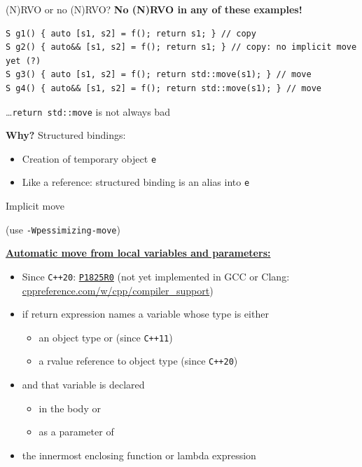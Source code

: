 \documentclass[compress,aspectratio=1610]{beamer}
\begin{document}
\begin{frame}[fragile]{(N)RVO or no (N)RVO?}
    \textbf{No (N)RVO in any of these examples!}
    \begin{lstlisting}
S g1() { auto [s1, s2] = f(); return s1; } // copy
S g2() { auto&& [s1, s2] = f(); return s1; } // copy: no implicit move yet (?)
S g3() { auto [s1, s2] = f(); return std::move(s1); } // move
S g4() { auto&& [s1, s2] = f(); return std::move(s1); } // move
    \end{lstlisting}
    
    \hfill \ldots \texttt{return std::move} is not always bad

    \textbf{Why?} Structured bindings:
    \begin{itemize}
        \item Creation of temporary object \texttt{e}
        \item Like a reference: structured binding is an alias into \texttt{e}
    \end{itemize}
\end{frame}

\begin{frame}{Implicit move}
    \begin{center}

        (use \texttt{-Wpessimizing-move})
    \end{center}

    \href{https://en.cppreference.com/w/cpp/language/return}{\textbf{Automatic move from local variables and parameters:}}
    \begin{itemize}
        \item Since \texttt{C++20}: \href{http://www.open-std.org/jtc1/sc22/wg21/docs/papers/2019/p1825r0.html}{\texttt{P1825R0}} (not yet implemented in GCC or Clang: \href{https://en.cppreference.com/w/cpp/compiler_support}{cppreference.com/w/cpp/compiler\_support})
        \item if return expression names a variable whose type is either
        \begin{itemize}
            \item an object type or (since \texttt{C++11})
            \item a rvalue reference to object type (since \texttt{C++20})
        \end{itemize}
        \item and that variable is declared
        \begin{itemize}
            \item in the body or
            \item as a parameter of
        \end{itemize}
        \item the innermost enclosing function or lambda expression
    \end{itemize}
\end{frame}
\end{document}

